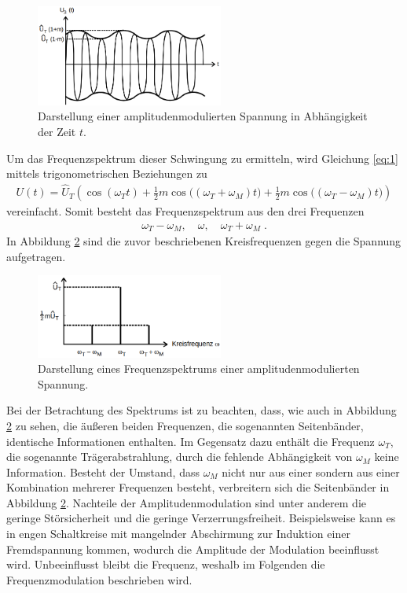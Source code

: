 \begin{figure}
    \centering
    \includegraphics[width=0.55\textwidth]{ressources/T1.png}
    \caption{Darstellung einer amplitudenmodulierten Spannung in Abhängigkeit der Zeit $t$\cite{skript}.}
    \label{fig_T1}
\end{figure}

Um das Frequenzspektrum dieser Schwingung zu ermitteln, wird Gleichung \eqref{eq:1} mittels trigonometrischen Beziehungen zu
\begin{align}
	U(t)=\hat{U}_T\left(\cos{(\omega_Tt)+\frac{1}{2}m\cos{\big((\omega_T+\omega_M)t\big)}}+\frac{1}{2}m\cos{\big((\omega_T-\omega_M)t\big)}\right)
\end{align}
vereinfacht. Somit besteht das Frequenzspektrum aus den drei Frequenzen
\begin{align}
	\omega_T-\omega_M,\quad\omega,\quad\omega_T+\omega_M\;.
\end{align}
In Abbildung \ref{fig_T2} sind die zuvor beschriebenen Kreisfrequenzen gegen die Spannung aufgetragen.

\begin{figure}
    \centering
    \includegraphics[width=0.55\textwidth]{ressources/T2.png}
    \caption{Darstellung eines Frequenzspektrums einer amplitudenmodulierten Spannung\cite{skript}.}
    \label{fig_T2}
\end{figure}

Bei der Betrachtung des Spektrums ist zu beachten, dass, wie auch in Abbildung \ref{fig_T2} zu sehen, die äußeren beiden Frequenzen, die sogenannten Seitenbänder, identische Informationen enthalten. Im Gegensatz dazu enthält die Frequenz $\omega_T$, die sogenannte Trägerabstrahlung, durch die fehlende Abhängigkeit von $\omega_M$ keine Information. Besteht der Umstand, dass $\omega_M$ nicht nur aus einer sondern aus einer Kombination mehrerer Frequenzen besteht, verbreitern sich die Seitenbänder in Abbildung \ref{fig_T2}. Nachteile der Amplitudenmodulation sind unter anderem die geringe Störsicherheit und die geringe Verzerrungsfreiheit. Beispielsweise kann es in engen Schaltkreise mit mangelnder Abschirmung zur Induktion einer Fremdspannung kommen, wodurch die Amplitude der Modulation beeinflusst wird. Unbeeinflusst bleibt die Frequenz, weshalb im Folgenden die Frequenzmodulation beschrieben wird.

